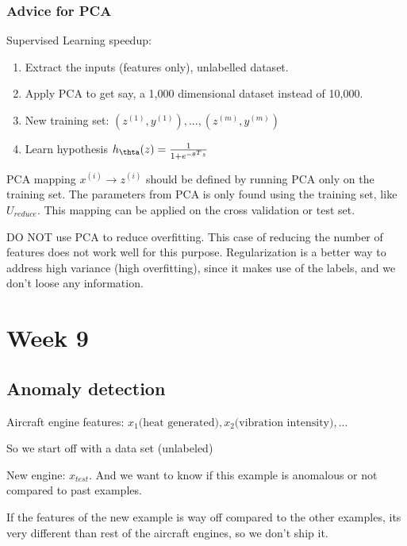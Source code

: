 \documentclass{article}
\begin{document}
\subsubsection{Advice for PCA}

Supervised Learning speedup: 

\begin{enumerate}
    \item Extract the inputs (features only), unlabelled dataset.
    \item Apply PCA to get say, a 1,000 dimensional dataset instead of 10,000.
    \item New training set: $(z^{(1)}, y^{(1)}), ..., (z^{(m)}, y^{(m)})$
    \item Learn hypothesis $h_{\thta} (z) = \frac{1}{1 + e^{-\theta^T z}}$
\end{enumerate}

PCA mapping $x^{(i)} \longrightarrow z^{(i)}$ should be defined by running PCA only on the training set. The parameters from PCA is only found using the training set, like $U_{reduce}$. This mapping can be applied on the cross validation or test set.

\begin{myboxr}
DO NOT use PCA to reduce overfitting. This case of reducing the number of features does not work well for this purpose. Regularization is a better way to address high variance (high overfitting), since it makes use of the labels, and we don't loose any information.
\end{myboxr}






\section{Week 9}

\subsection{Anomaly detection}


Aircraft engine features: $x_1 \text{(heat generated)}, x_2 \text{(vibration intensity)}, ...$

So we start off with a data set (unlabeled)

New engine: $x_{test}$. And we want to know if this example is anomalous or not compared to past examples.


If the features of the new example is way off compared to the other examples, its very different than rest of the aircraft engines, so we don't ship it.
\end{document}
